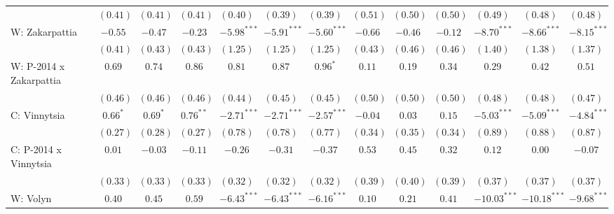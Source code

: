 \begin{table}
\begin{center}
\begin{tiny}
\begin{tabular}{l c c c c c c c c c c c c}
                            & $(0.41)$      & $(0.41)$     & $(0.41)$      & $(0.40)$       & $(0.39)$       & $(0.39)$       & $(0.51)$      & $(0.50)$    & $(0.50)$       & $(0.49)$       & $(0.48)$       & $(0.48)$       \\
W: Zakarpattia              & $-0.55$       & $-0.47$      & $-0.23$       & $-5.98^{***}$  & $-5.91^{***}$  & $-5.60^{***}$  & $-0.66$       & $-0.46$     & $-0.12$        & $-8.70^{***}$  & $-8.66^{***}$  & $-8.15^{***}$  \\
                            & $(0.41)$      & $(0.43)$     & $(0.43)$      & $(1.25)$       & $(1.25)$       & $(1.25)$       & $(0.43)$      & $(0.46)$    & $(0.46)$       & $(1.40)$       & $(1.38)$       & $(1.37)$       \\
W: P-2014 x Zakarpattia     & $0.69$        & $0.74$       & $0.86$        & $0.81$         & $0.87$         & $0.96^{*}$     & $0.11$        & $0.19$      & $0.34$         & $0.29$         & $0.42$         & $0.51$         \\
                            & $(0.46)$      & $(0.46)$     & $(0.46)$      & $(0.44)$       & $(0.45)$       & $(0.45)$       & $(0.50)$      & $(0.50)$    & $(0.50)$       & $(0.48)$       & $(0.48)$       & $(0.47)$       \\
C: Vinnytsia                & $0.66^{*}$    & $0.69^{*}$   & $0.76^{**}$   & $-2.71^{***}$  & $-2.71^{***}$  & $-2.57^{***}$  & $-0.04$       & $0.03$      & $0.15$         & $-5.03^{***}$  & $-5.09^{***}$  & $-4.84^{***}$  \\
                            & $(0.27)$      & $(0.28)$     & $(0.27)$      & $(0.78)$       & $(0.78)$       & $(0.77)$       & $(0.34)$      & $(0.35)$    & $(0.34)$       & $(0.89)$       & $(0.88)$       & $(0.87)$       \\
C: P-2014 x Vinnytsia       & $0.01$        & $-0.03$      & $-0.11$       & $-0.26$        & $-0.31$        & $-0.37$        & $0.53$        & $0.45$      & $0.32$         & $0.12$         & $0.00$         & $-0.07$        \\
                            & $(0.33)$      & $(0.33)$     & $(0.33)$      & $(0.32)$       & $(0.32)$       & $(0.32)$       & $(0.39)$      & $(0.40)$    & $(0.39)$       & $(0.37)$       & $(0.37)$       & $(0.37)$       \\
W: Volyn                    & $0.40$        & $0.45$       & $0.59$        & $-6.43^{***}$  & $-6.43^{***}$  & $-6.16^{***}$  & $0.10$        & $0.21$      & $0.41$         & $-10.03^{***}$ & $-10.18^{***}$ & $-9.68^{***}$  \\

\end{tabular}
\end{tiny}
\end{center}
\end{table}
